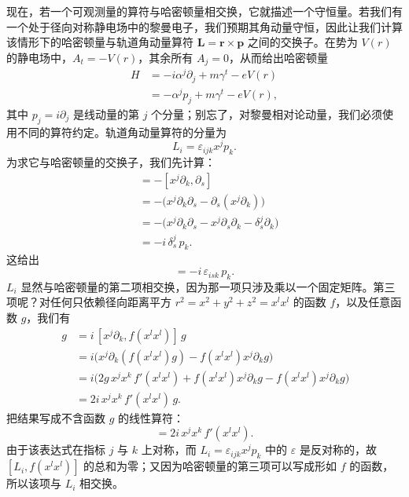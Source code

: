 现在，若一个可观测量的算符与哈密顿量相交换，它就描述一个守恒量。若我们有一个处于径向对称静电场中的黎曼电子，我们预期其角动量守恒，因此让我们计算该情形下的哈密顿量与轨道角动量算符 $\mathbf{L}=\mathbf{r}\times\mathbf{p}$ 之间的交换子。在势为 $V(r)$ 的静电场中，$A_{t}=-V(r)$，其余所有 $A_{j}=0$，从而给出哈密顿量
\begin{align*}
H &= -i\alpha^{j}\partial_{j}+m\gamma^{t}-eV(r)\\
&= -\alpha^{j}p_{j}+m\gamma^{t}-eV(r),
\end{align*}
其中 $p_{j}=i\partial_{j}$ 是线动量的第 $j$ 个分量；别忘了，对黎曼相对论动量，我们必须使用不同的算符约定。轨道角动量算符的分量为
\begin{equation}
L_{i}=\varepsilon_{ijk}x^{j}p_{k}.
\end{equation}
为求它与哈密顿量的交换子，我们先计算：
\begin{align*}
[x^{j}p_{k},p_{s}]
&= -[x^{j}\partial_{k},\partial_{s}]\\
&= -\bigl(x^{j}\partial_{k}\partial_{s}-\partial_{s}(x^{j}\partial_{k})\bigr)\\
&= -\bigl(x^{j}\partial_{k}\partial_{s}-x^{j}\partial_{s}\partial_{k}-\delta_{s}^{j}\partial_{k}\bigr)\\
&= -i\,\delta_{s}^{j}\,p_{k}.
\end{align*}
这给出
\begin{equation}
[L_{i},p_{s}]=-i\,\varepsilon_{isk}\,p_{k}.
\end{equation}
$L_{i}$ 显然与哈密顿量的第二项相交换，因为那一项只涉及乘以一个固定矩阵。第三项呢？对任何只依赖径向距离平方 $r^{2}=x^{2}+y^{2}+z^{2}=x^{l}x^{l}$ 的函数 $f$，以及任意函数 $g$，我们有
\begin{align*}
[x^{j}p_{k},f(x^{l}x^{l})]\,g
&= i\,[x^{j}\partial_{k},f(x^{l}x^{l})]\,g\\
&= i\bigl(x^{j}\partial_{k}(f(x^{l}x^{l})g)-f(x^{l}x^{l})x^{j}\partial_{k}g\bigr)\\
&= i\bigl(2g\,x^{j}x^{k}\,f'(x^{l}x^{l})+f(x^{l}x^{l})x^{j}\partial_{k}g-f(x^{l}x^{l})x^{j}\partial_{k}g\bigr)\\
&= 2i\,x^{j}x^{k}\,f'(x^{l}x^{l})\,g .
\end{align*}
把结果写成不含函数 $g$ 的线性算符：
\begin{equation}
[x^{j}p_{k},f(x^{l}x^{l})]=2i\,x^{j}x^{k}\,f'(x^{l}x^{l}).
\end{equation}
由于该表达式在指标 $j$ 与 $k$ 上对称，而 $L_{i}=\varepsilon_{ijk}x^{j}p_{k}$ 中的 $\varepsilon$ 是反对称的，故 $[L_{i},f(x^{l}x^{l})]$ 的总和为零；又因为哈密顿量的第三项可以写成形如 $f$ 的函数，所以该项与 $L_{i}$ 相交换。


